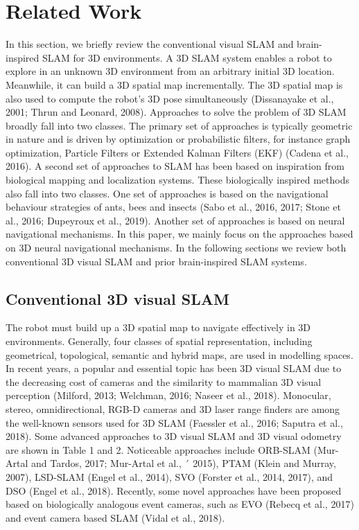 \section{Related Work}

In this section, we briefly review the conventional visual SLAM and brain-inspired SLAM for 3D environments. 
A 3D SLAM system enables a robot to explore in an unknown 3D environment from an arbitrary initial 3D location. 
Meanwhile, it can build a 3D spatial map incrementally. 
The 3D spatial map is also used to compute the robot’s 3D pose simultaneously (Dissanayake et al., 2001; Thrun and Leonard, 2008). 
Approaches to solve the problem of 3D SLAM broadly fall into two classes. 
The primary set of approaches is typically geometric in nature and is driven by optimization or probabilistic filters, for instance graph optimization, Particle Filters or Extended Kalman Filters (EKF) (Cadena et al., 2016). 
A second set of approaches to SLAM has been based on inspiration from biological mapping and localization systems. 
These biologically inspired methods also fall into two classes. 
One set of approaches is based on the navigational behaviour strategies of ants, bees and insects (Sabo et al., 2016, 2017; Stone et al., 2016; Dupeyroux et al., 2019). 
Another set of approaches is based on neural navigational mechanisms. 
In this paper, we mainly focus on the approaches based on 3D neural navigational mechanisms. 
In the following sections we review both conventional 3D visual SLAM and prior brain-inspired SLAM systems.


\subsection{Conventional 3D visual SLAM}
\hspace{1pc}The robot must build up a 3D spatial map to navigate effectively in 3D environments. 
Generally, four classes of spatial representation, including geometrical, topological, semantic and hybrid maps, are used in modelling spaces. 
In recent years, a popular and essential topic has been 3D visual SLAM due to the decreasing cost of cameras and the similarity to mammalian 3D visual perception (Milford, 2013; Welchman, 2016; Naseer et al., 2018). 
Monocular, stereo, omnidirectional, RGB-D cameras and 3D laser range finders are among the well-known sensors used for 3D SLAM (Faessler et al., 2016; Saputra et al., 2018). 
Some advanced approaches to 3D visual SLAM and 3D visual odometry are shown in Table 1 and 2. Noticeable approaches include ORB-SLAM (Mur-Artal and Tardos, 2017; Mur-Artal et al., ´ 2015), PTAM (Klein and Murray, 2007), LSD-SLAM (Engel et al., 2014), SVO (Forster et al., 2014, 2017), and DSO (Engel et al., 2018). 
Recently, some novel approaches have been proposed based on biologically analogous event cameras, such as EVO (Rebecq et al., 2017) and event camera based SLAM (Vidal et al., 2018).


